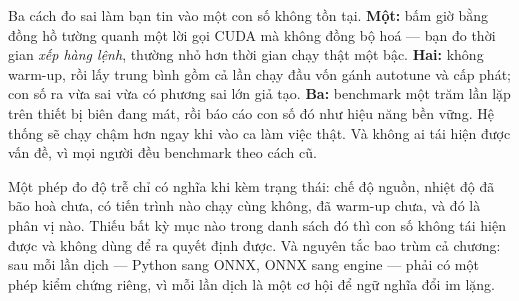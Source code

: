 \documentclass[../../deep_learning.tex]{subfiles}
\begin{document}
\begin{cambay}
Ba cách đo sai làm bạn tin vào một con số không tồn tại. \textbf{Một:} bấm giờ bằng đồng hồ tường quanh một lời gọi CUDA mà không đồng bộ hoá --- bạn đo thời gian \emph{xếp hàng lệnh}, thường nhỏ hơn thời gian chạy thật một bậc. \textbf{Hai:} không warm-up, rồi lấy trung bình gồm cả lần chạy đầu vốn gánh autotune và cấp phát; con số ra vừa sai vừa có phương sai lớn giả tạo. \textbf{Ba:} benchmark một trăm lần lặp trên thiết bị biên đang mát, rồi báo cáo con số đó như hiệu năng bền vững. Hệ thống sẽ chạy chậm hơn ngay khi vào ca làm việc thật. Và không ai tái hiện được vấn đề, vì mọi người đều benchmark theo cách cũ.
\end{cambay}

\begin{cannho}
Một phép đo độ trễ chỉ có nghĩa khi kèm trạng thái: chế độ nguồn, nhiệt độ đã bão hoà chưa, có tiến trình nào chạy cùng không, đã warm-up chưa, và đó là phân vị nào. Thiếu bất kỳ mục nào trong danh sách đó thì con số không tái hiện được và không dùng để ra quyết định được. Và nguyên tắc bao trùm cả chương: sau mỗi lần dịch --- Python sang ONNX, ONNX sang engine --- phải có một phép kiểm chứng riêng, vì mỗi lần dịch là một cơ hội để ngữ nghĩa đổi im lặng. 
\end{cannho}
\end{document}
